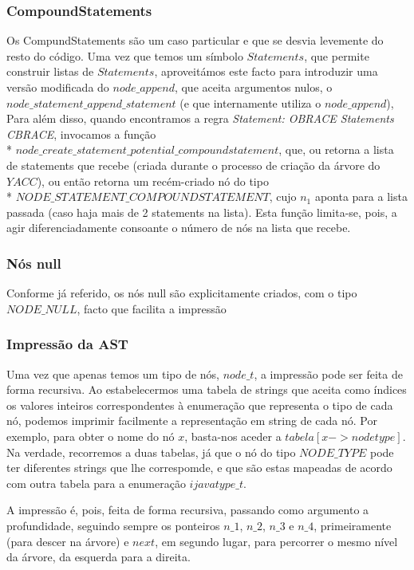 \documentclass[11pt,a4paper]{article}
\begin{document}
\subsubsection{CompoundStatements}

Os CompundStatements são um caso particular e que se desvia levemente do resto do código. Uma vez que temos um símbolo $Statements$, que permite construir listas de $Statements$, aproveitámos este facto para introduzir uma versão modificada do $node\_append$, que aceita argumentos nulos, o $node\_statement\_append\_statement$ (e que internamente utiliza o $node\_append$), Para além disso, quando encontramos a regra \emph{Statement: OBRACE Statements CBRACE}, invocamos a função   \\* $node\_create\_statement\_potential\_compoundstatement$, que, ou retorna a lista de statements que recebe (criada durante o processo de criação da árvore do $YACC$), ou então retorna um recém-criado nó do tipo   \\* $NODE\_STATEMENT\_COMPOUNDSTATEMENT$, cujo $n_1$ aponta para a lista passada (caso haja mais de 2 statements na lista). Esta função limita-se, pois, a agir diferenciadamente consoante o número de nós na lista que recebe.

\subsubsection{Nós null}

Conforme já referido, os nós null são explicitamente criados, com o tipo $NODE\_NULL$, facto que facilita a impressão

\subsubsection{Impressão da AST}

Uma vez que apenas temos um tipo de nós, $node\_t$, a impressão pode ser feita de forma recursiva. Ao estabelecermos uma tabela de strings que aceita como índices os valores inteiros correspondentes à enumeração que representa o tipo de cada nó, podemos imprimir facilmente a representação em string de cada nó. Por exemplo, para obter o nome do nó $x$, basta-nos aceder a $tabela[x->nodetype]$. Na verdade, recorremos a duas tabelas, já que o nó do tipo $NODE\_TYPE$ pode ter diferentes strings que lhe correspomde, e que são estas mapeadas de acordo com outra tabela para a enumeração $ijavatype\_t$.

A impressão é, pois, feita de forma recursiva, passando como argumento a profundidade, seguindo sempre os ponteiros $n\_1$, $n\_2$, $n\_3$ e $n\_4$, primeiramente (para descer na árvore) e $next$, em segundo lugar, para percorrer o mesmo nível da árvore, da esquerda para a direita.
\end{document}
